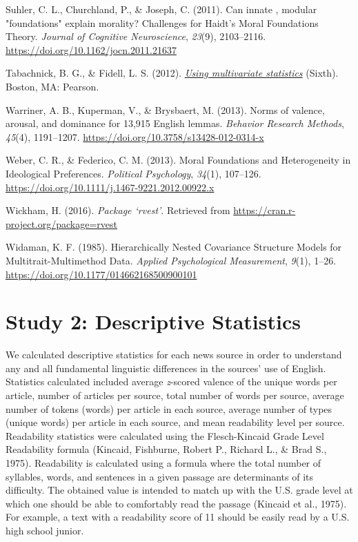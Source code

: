\documentclass[
  man,floatsintext]{apa6}
\newlength{\cslhangindent}
\newenvironment{CSLReferences}[2] %
 {\begin{list}{}{%
  \setlength{\itemindent}{0pt}
  \setlength{\leftmargin}{0pt}
  \setlength{\parsep}{0pt}
  \ifodd #1
   \setlength{\leftmargin}{\cslhangindent}
   \setlength{\itemindent}{-1\cslhangindent}
  \fi
  \setlength{\itemsep}{#2\baselineskip}}}
 {\end{list}}
\begin{document}
\begin{CSLReferences}{1}{0}
Suhler, C. L., Churchland, P., \& Joseph, C. (2011). Can innate , modular "foundations" explain morality? Challenges for {H}aidt's {M}oral {F}oundations {T}heory. \emph{Journal of Cognitive Neuroscience}, \emph{23}(9), 2103--2116. \url{https://doi.org/10.1162/jocn.2011.21637}

Tabachnick, B. G., \& Fidell, L. S. (2012). \emph{\href{https://www.ncbi.nlm.nih.gov/pubmed/1577}{{Using multivariate statistics}}} (Sixth). Boston, MA: Pearson.

Warriner, A. B., Kuperman, V., \& Brysbaert, M. (2013). {Norms of valence, arousal, and dominance for 13,915 English lemmas}. \emph{Behavior Research Methods}, \emph{45}(4), 1191--1207. \url{https://doi.org/10.3758/s13428-012-0314-x}

Weber, C. R., \& Federico, C. M. (2013). {Moral Foundations and Heterogeneity in Ideological Preferences}. \emph{Political Psychology}, \emph{34}(1), 107--126. \url{https://doi.org/10.1111/j.1467-9221.2012.00922.x}

Wickham, H. (2016). \emph{{Package `rvest'}}. Retrieved from \url{https://cran.r-project.org/package=rvest}

Widaman, K. F. (1985). Hierarchically Nested Covariance Structure Models for Multitrait-Multimethod Data. \emph{Applied Psychological Measurement}, \emph{9}(1), 1--26. \url{https://doi.org/10.1177/014662168500900101}

\end{CSLReferences}

\newpage

\appendix


\section{Study 2: Descriptive Statistics}\label{study-2-descriptive-statistics}

We calculated descriptive statistics for each news source in order to
understand any and all fundamental linguistic differences in the
sources' use of English. Statistics calculated included average
\emph{z}-scored valence of the unique words per article, number of articles
per source, total number of words per source, average number of tokens
(words) per article in each source, average number of types (unique
words) per article in each source, and mean readability level per
source. Readability statistics were calculated using the Flesch-Kincaid
Grade Level Readability formula (Kincaid, Fishburne, Robert P., Richard L., \& Brad S., 1975). Readability is
calculated using a formula where the total number of syllables, words,
and sentences in a given passage are determinants of its difficulty. The
obtained value is intended to match up with the U.S. grade level at
which one should be able to comfortably read the passage (Kincaid et al., 1975).
For example, a text with a readability score of 11 should be easily read
by a U.S. high school junior.
\end{document}
